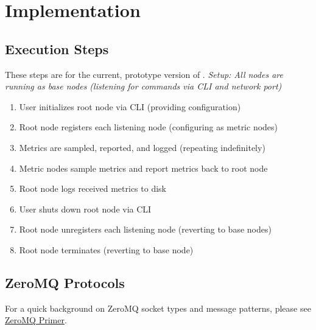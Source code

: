 \chapter{Implementation}
\label{implementation}

\section{Execution Steps}

These steps are for the current, prototype version of \dcamp. \textit{Setup: All nodes are running as base nodes
(listening for commands via CLI and network port)}

\begin{enumerate}

\item User initializes root node via CLI (providing configuration) 
\item Root node registers each listening node (configuring as metric nodes) 
\item Metrics are sampled, reported, and logged (repeating indefinitely) 
\item Metric nodes sample metrics and report metrics back to root node 
\item Root node logs received metrics to disk 
\item User shuts down root node via CLI 
\item Root node unregisters each listening node (reverting to base nodes) 
\item Root node terminates (reverting to base node)

\end{enumerate}

\section{ZeroMQ Protocols}

For a quick background on ZeroMQ socket types and message patterns, please see \hyperref[zeromq_primer]{ZeroMQ Primer}.




% 
